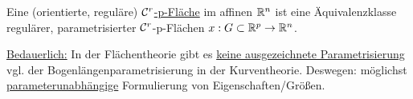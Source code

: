 \begin{definition}
Eine (orientierte, reguläre) \uline{\(\mathcal{C}^r\)-p-Fläche} im affinen \( \mathbb{R}^n\) ist eine Äquivalenzklasse regulärer, parametrisierter \(\mathcal{C}^r\)-p-Flächen \(x : G \subset \mathbb{R}^p \rightarrow \mathbb{R}^n\).
\end{definition}

\uline{Bedauerlich:}
In der Flächentheorie gibt es \uline{keine ausgezeichnete Parametrisierung} vgl. der Bogenlängenparametrisierung in der Kurventheorie. Deswegen: möglichst \uline{parameterunabhängige} Formulierung von Eigenschaften/Größen. 